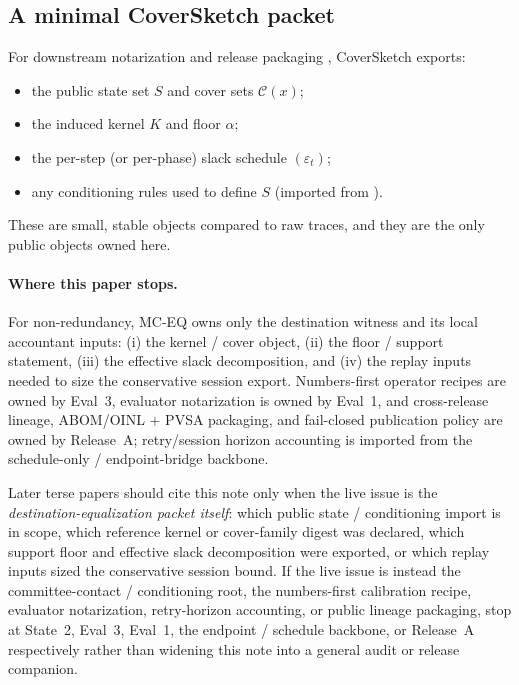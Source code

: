 \documentclass[11pt]{article}
\newcommand{\eps}{\varepsilon}
\begin{document}
\subsection{A minimal CoverSketch packet}
For downstream notarization and release packaging \cite{series:release}, CoverSketch exports:
\begin{itemize}[leftmargin=1.2em]
\item the public state set $S$ and cover sets $\mathcal{C}(x)$;
\item the induced kernel $K$ and floor $\alpha$;
\item the per-step (or per-phase) slack schedule $(\eps_t)$;
\item any conditioning rules used to define $S$ (imported from \cite{series:state2}).
\end{itemize}
These are small, stable objects compared to raw traces, and they are the only public objects owned here.


\paragraph{Where this paper stops.}
For non-redundancy, MC-EQ owns only the destination witness and its local accountant inputs: (i) the kernel / cover object, (ii) the floor / support statement, (iii) the effective slack decomposition, and (iv) the replay inputs needed to size the conservative session export. Numbers-first operator recipes are owned by Eval~3, evaluator notarization is owned by Eval~1, and cross-release lineage, ABOM/OINL + PVSA packaging, and fail-closed publication policy are owned by Release~A; retry/session horizon accounting is imported from the schedule-only / endpoint-bridge backbone.\cite{series:eval3,series:eval1,series:release,series:endpointbridge,series:schedcompiler}

Later terse papers should cite this note only when the live issue is the \emph{destination-equalization packet itself}: which public state / conditioning import is in scope, which reference kernel or cover-family digest was declared, which support floor and effective slack decomposition were exported, or which replay inputs sized the conservative session bound.
If the live issue is instead the committee-contact / conditioning root, the numbers-first calibration recipe, evaluator notarization, retry-horizon accounting, or public lineage packaging, stop at State~2, Eval~3, Eval~1, the endpoint / schedule backbone, or Release~A respectively rather than widening this note into a general audit or release companion.\cite{series:state2,series:eval3,series:eval1,series:endpointbridge,series:schedcompiler,series:release}
\end{document}
